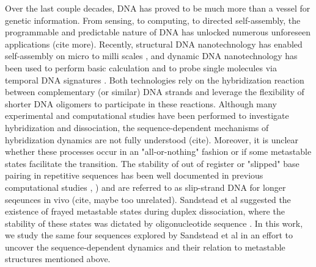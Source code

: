 \documentclass[journal=jpcbfk,manuscript=article]{achemso}
\begin{document}
Over the last couple decades, DNA has proved to be much more than a vessel for genetic information. From sensing, to computing, to directed self-assembly, the programmable and predictable nature of DNA has unlocked numerous unforeseen applications \citep{Seeman2017DNANanotechnology} (cite more). Recently, structural DNA nanotechnology has enabled self-assembly on micro to milli scales \citep{MhatreV.HoJi-AnnLee2012NIHAccess}, and dynamic DNA nanotechnology has been used to perform basic calculation \citep{Bui2018} and to probe single molecules via temporal DNA signatures \citep{Shah2019}. Both technologies rely on the hybridization reaction between complementary (or similar) DNA strands and leverage the flexibility of shorter DNA oligomers to participate in these reactions. Although many experimental and computational studies have been performed to investigate hybridization and dissociation, the sequence-dependent mechanisms of hybridization dynamics are not fully understood (cite). Moreover, it is unclear whether these processes occur in an "all-or-nothing" fashion or if some metastable states facilitate the transition. The stability of out of register or "slipped" base pairing in repetitive sequences has been well documented in previous computational studies \citep{Phys2014}, \citep{Xiao2019}) and are referred to as slip-strand DNA for longer seqeunces in vivo (cite, maybe too unrelated). Sandstead et al suggested the existence of frayed metastable states during duplex dissociation, where the stability of these states was dictated by oligonucleotide sequence \citep{Sanstead2016}. In this work, we study the same four sequences explored by Sandstead et al in an effort to uncover the sequence-dependent dynamics and their relation to  metastable structures mentioned above.
\end{document}
